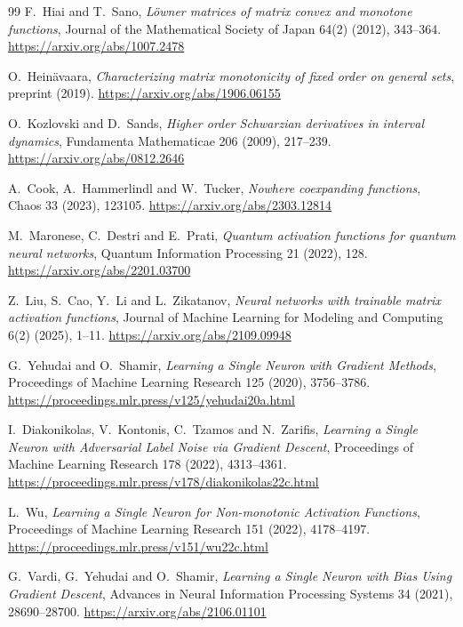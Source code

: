 \documentclass[11pt]{article}
\begin{document}
\begin{thebibliography}{99}
\small
{}
F.~Hiai and T.~Sano,
\emph{L\"owner matrices of matrix convex and monotone functions},
Journal of the Mathematical Society of Japan 64(2) (2012), 343--364.
\url{https://arxiv.org/abs/1007.2478}

O.~Hein\"avaara,
\emph{Characterizing matrix monotonicity of fixed order on general sets},
preprint (2019).
\url{https://arxiv.org/abs/1906.06155}

O.~Kozlovski and D.~Sands,
\emph{Higher order Schwarzian derivatives in interval dynamics},
Fundamenta Mathematicae 206 (2009), 217--239.
\url{https://arxiv.org/abs/0812.2646}

A.~Cook, A.~Hammerlindl and W.~Tucker,
\emph{Nowhere coexpanding functions},
Chaos 33 (2023), 123105.
\url{https://arxiv.org/abs/2303.12814}

M.~Maronese, C.~Destri and E.~Prati,
\emph{Quantum activation functions for quantum neural networks},
Quantum Information Processing 21 (2022), 128.
\url{https://arxiv.org/abs/2201.03700}

Z.~Liu, S.~Cao, Y.~Li and L.~Zikatanov,
\emph{Neural networks with trainable matrix activation functions},
Journal of Machine Learning for Modeling and Computing 6(2) (2025), 1--11.
\url{https://arxiv.org/abs/2109.09948}

G.~Yehudai and O.~Shamir,
\emph{Learning a Single Neuron with Gradient Methods},
Proceedings of Machine Learning Research 125 (2020), 3756--3786.
\url{https://proceedings.mlr.press/v125/yehudai20a.html}

I.~Diakonikolas, V.~Kontonis, C.~Tzamos and N.~Zarifis,
\emph{Learning a Single Neuron with Adversarial Label Noise via Gradient Descent},
Proceedings of Machine Learning Research 178 (2022), 4313--4361.
\url{https://proceedings.mlr.press/v178/diakonikolas22c.html}

L.~Wu,
\emph{Learning a Single Neuron for Non-monotonic Activation Functions},
Proceedings of Machine Learning Research 151 (2022), 4178--4197.
\url{https://proceedings.mlr.press/v151/wu22c.html}

G.~Vardi, G.~Yehudai and O.~Shamir,
\emph{Learning a Single Neuron with Bias Using Gradient Descent},
Advances in Neural Information Processing Systems 34 (2021), 28690--28700.
\url{https://arxiv.org/abs/2106.01101}


\end{thebibliography}
\end{document}

